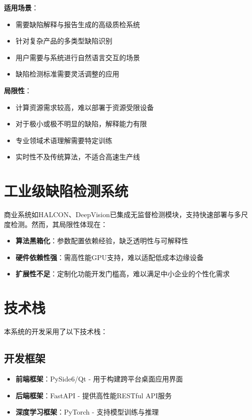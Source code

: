 \documentclass[
  ]{njuthesis}
\begin{document}
\textbf{适用场景}：
\begin{itemize}
    \item 需要缺陷解释与报告生成的高级质检系统
    \item 针对复杂产品的多类型缺陷识别
    \item 用户需要与系统进行自然语言交互的场景
    \item 缺陷检测标准需要灵活调整的应用
\end{itemize}

\textbf{局限性}：
\begin{itemize}
    \item 计算资源需求较高，难以部署于资源受限设备
    \item 对于极小或极不明显的缺陷，解释能力有限
    \item 专业领域术语理解需要特定训练
    \item 实时性不及传统算法，不适合高速生产线
\end{itemize}

\section{工业级缺陷检测系统}

商业系统如HALCON、DeepVision已集成无监督检测模块，支持快速部署与多尺度检测。然而，其局限性体现在：
\begin{itemize}
    \item \textbf{算法黑箱化}：参数配置依赖经验，缺乏透明性与可解释性
    \item \textbf{硬件依赖性强}：需高性能GPU支持，难以适配低成本边缘设备
    \item \textbf{扩展性不足}：定制化功能开发门槛高，难以满足中小企业的个性化需求
\end{itemize}

\section{技术栈}

本系统的开发采用了以下技术栈：

\subsection{开发框架}
\begin{itemize}
    \item \textbf{前端框架}：PySide6/Qt - 用于构建跨平台桌面应用界面
    \item \textbf{后端框架}：FastAPI - 提供高性能RESTful API服务
    \item \textbf{深度学习框架}：PyTorch - 支持模型训练与推理
\end{itemize}
\end{document}
